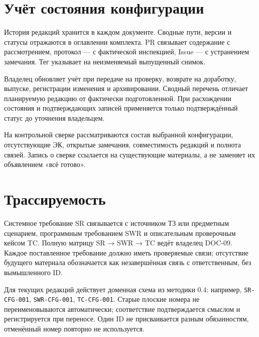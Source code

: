 \documentclass[12pt,a4paper]{article}
\begin{document}
\section{Учёт состояния конфигурации}\label{6-ux443ux447ux451ux442-ux441ux43eux441ux442ux43eux44fux43dux438ux44f-ux43aux43eux43dux444ux438ux433ux443ux440ux430ux446ux438ux438}

\hypertarget{6-учёт-состояния-конфигурации}{}

История редакций хранится в каждом документе. Сводные пути, версии и статусы отражаются в оглавлении комплекта. PR связывает содержание с рассмотрением, протокол --- с фактической инспекцией, Issue --- с устранением замечания. Тег указывает на неизменяемый выпущенный снимок.

Владелец обновляет учёт при передаче на проверку, возврате на доработку, выпуске, регистрации изменения и архивировании. Сводный перечень отличает планируемую редакцию от фактически подготовленной. При расхождении состояния и подтверждающих записей применяется только подтверждённый статус до уточнения владельцем.

На контрольной сверке рассматриваются состав выбранной конфигурации, отсутствующие ЭК, открытые замечания, совместимость редакций и полнота связей. Запись о сверке ссылается на существующие материалы, а не заменяет их объявлением «всё готово».

\section{Трассируемость}\label{7-ux442ux440ux430ux441ux441ux438ux440ux443ux435ux43cux43eux441ux442ux44c}

\hypertarget{7-трассируемость}{}

Системное требование SR связывается с источником ТЗ или предметным сценарием, программным требованием SWR и описательным проверочным кейсом TC. Полную матрицу SR → SWR → TC ведёт владелец DOC-09. Каждое поставленное требование должно иметь проверяемые связи; отсутствие будущего материала обозначается как незавершённая связь с ответственным, без вымышленного ID.

Для текущих редакций действует доменная схема из методики 0.4: например, \texttt{SR-CFG-001}, \texttt{SWR-\allowbreak{}CFG-\allowbreak{}001}, \texttt{TC-CFG-001}. Старые плоские номера не переименовываются автоматически; соответствие подтверждается смыслом и регистрируется при переносе. Один ID не присваивается разным обязанностям, отменённый номер повторно не используется.
\end{document}
